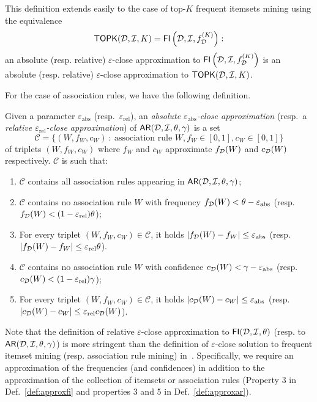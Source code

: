 This definition extends easily to the case of top-$K$ frequent itemsets mining
using the equivalence 
\[ \mathsf{TOPK}({\cal D},{\cal I},K)=\mathsf{FI}\left({\cal D},{\cal I},f^{(K)}_{\cal D}\right):\]
an absolute (resp.  relative) $\varepsilon$-close approximation to
$\mathsf{FI}\left({\cal D},{\cal I},f^{(K)}_{\cal D}\right)$ is an absolute (resp. relative)
$\varepsilon$-close approximation to $\mathsf{TOPK}({\cal D},{\cal I},K)$.

For the case of association rules, we have the following definition.

\begin{definition}\label{def:approxar} Given a parameter
  $\varepsilon_{\mathrm{abs}}$ (resp.~$\varepsilon_{\mathrm{rel}}$), an
  \emph{absolute $\varepsilon_{\mathrm{abs}}$-close approximation}  (resp.~a
  \emph{relative $\varepsilon_{\mathrm{rel}}$-close approximation}) of
  $\mathsf{AR}({\cal D},{\cal I},\theta,\gamma)$ is a set 
  \[
  \mathcal{C}=\{(W, f_W, c_W) ~:~
  \mbox{association rule } W, f_W\in[0,1], c_W\in[0,1]\}\]
  of triplets $(W, f_W, c_W)$ where $f_W$ and $c_W$ approximate $f_{\cal D}(W)$ and $c_{\cal D}(W)$
  respectively. $\mathcal{C}$ is such that:
  \begin{enumerate} 
      \item
      $\mathcal{C}$ contains all association rules appearing in
      $\mathsf{AR}({\cal D},{\cal I},\theta,\gamma)$; \item $\mathcal{C}$ contains no association
      rule $W$ with frequency $f_{\cal D}(W)<\theta-\varepsilon_{\mathrm{abs}}$
      (resp. $f_{\cal D}(W)< (1-\varepsilon_{\mathrm{rel}})\theta$);
    \item For every triplet $(W, f_W, c_W)\in\mathcal{C}$, it holds
      $|f_{\cal D}(W)-f_W|\le\varepsilon_\mathrm{abs}$ (resp.
      $|f_{\cal D}(W)-f_W|\le\varepsilon_\mathrm{rel}\theta$).
    \item $\mathcal{C}$ contains no association rule $W$ with confidence
      $c_{\cal D}(W)<\gamma-\varepsilon_{\mathrm{abs}}$ (resp. $c_{\cal D}(W)<
      (1-\varepsilon_{\mathrm{rel}})\gamma$);
    \item For every triplet $(W, f_W, c_W)\in\mathcal{C}$, it holds
      $|c_{\cal D}(W)-c_W|\le\varepsilon_\mathrm{abs}$ (resp.
      $|c_{\cal D}(W)-c_W|\le\varepsilon_\mathrm{rel}c_{\cal D}(W)$).
  \end{enumerate}
\end{definition}

Note that the definition of relative $\varepsilon$-close approximation to
$\mathsf{FI}({\cal D},{\cal I},\theta)$ (resp. to $\mathsf{AR}({\cal D},{\cal I},\theta,\gamma)$) is more
stringent than the definition of $\varepsilon$-close solution to frequent
itemset mining (resp. association rule mining)
in~\cite[Sect.~3]{ChakaravarthyPS09}. Specifically, we require an approximation
of the frequencies (and confidences) in addition to the approximation of
the collection of itemsets or association rules (Property 3 in Def.~\ref{def:approxfi} and properties
3 and 5 in Def.~\ref{def:approxar}).

